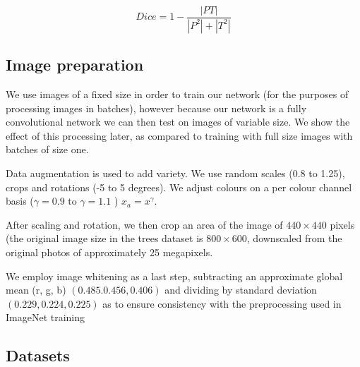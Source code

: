 \documentclass{article}
\begin{document}
\begin{equation}
Dice = 1 - \frac{| PT |}{| P^2 | + | T^2 |}
\label{eq:dice}
\end{equation}



\subsection {Image preparation}

We use images of a fixed size in order to train our network (for the purposes of processing images in batches), however because our network is a fully convolutional network we can then test on images of variable size. We show the effect of this processing later, as compared to training with full size images with batches of size one.

Data augmentation is used to add variety. We use random scales (0.8 to 1.25), crops and rotations (-5 to 5 degrees). We adjust colours on a per colour channel basis ($ \gamma = 0.9 $ to $ \gamma=1.1 $ )  $ x_a = x^{\gamma} $.

After scaling and rotation, we then crop an area of the image of $440 \times 440$ pixels (the original image size in the trees dataset is $800 \times 600$, downscaled from the original photos of approximately 25 megapixels.

We employ image whitening as a last step, subtracting an approximate global mean (r, g, b) $ (0.485. 0.456, 0.406) $ and dividing by standard deviation $ (0.229, 0.224, 0.225) $ as to ensure consistency with the preprocessing used in ImageNet training 



\subsection {Datasets}
\end{document}
